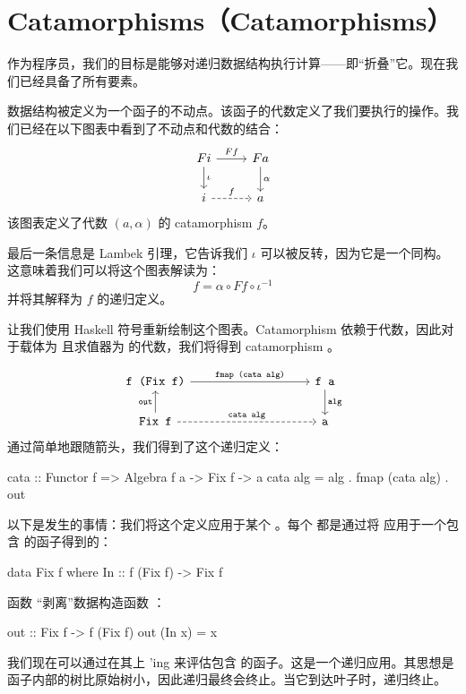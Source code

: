 \documentclass[DaoFP]{subfiles}
\begin{document}
\section{Catamorphisms（Catamorphisms）}

作为程序员，我们的目标是能够对递归数据结构执行计算——即“折叠”它。现在我们已经具备了所有要素。

数据结构被定义为一个函子的不动点。该函子的代数定义了我们要执行的操作。我们已经在以下图表中看到了不动点和代数的结合：
\[
 \begin{tikzcd}
 F i 
 \arrow[r, "F f"]
 \arrow[d, "\iota"]
 & F a
\arrow[d, "\alpha"]
 \\
 i
 \arrow[r, dashed, "f"]
 & a
  \end{tikzcd}
\]
该图表定义了代数 $(a, \alpha)$ 的 catamorphism $f$。

最后一条信息是 Lambek 引理，它告诉我们 $\iota$ 可以被反转，因为它是一个同构。这意味着我们可以将这个图表解读为：
\[ f = \alpha \circ F f \circ \iota^{-1} \]
并将其解释为 $f$ 的递归定义。

让我们使用 Haskell 符号重新绘制这个图表。Catamorphism 依赖于代数，因此对于载体为  且求值器为  的代数，我们将得到 catamorphism 。

\[
 \begin{tikzcd}
  \hask{f (Fix f)}
 \arrow[rrrr, "\hask{fmap (cata alg)}"]
 &&&& \hask{f a}
\arrow[d, "\hask{alg}"]
 \\
 \hask{Fix f}
 \arrow[u, "\hask{out}"]
 \arrow[rrrr, dashed, "\hask{cata alg}"]
 &&&& \hask{a}
  \end{tikzcd}
\]
通过简单地跟随箭头，我们得到了这个递归定义：
\begin{haskell}
cata :: Functor f => Algebra f a -> Fix f -> a
cata alg = alg . fmap (cata alg) . out
\end{haskell}

以下是发生的事情：我们将这个定义应用于某个 。每个  都是通过将  应用于一个包含  的函子得到的：
\begin{haskell}
data Fix f where
  In :: f (Fix f) -> Fix f
\end{haskell}
函数  “剥离”数据构造函数 ：
\begin{haskell}
out :: Fix f -> f (Fix f)
out (In x) = x
\end{haskell}

我们现在可以通过在其上 'ing  来评估包含  的函子。这是一个递归应用。其思想是函子内部的树比原始树小，因此递归最终会终止。当它到达叶子时，递归终止。
\end{document}
